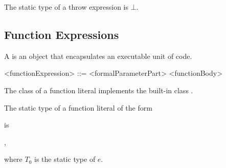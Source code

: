 \documentclass[makeidx]{article}
\begin{document}

\LMHash{}%
The static type of a throw expression is $\bot$.


\subsection{Function Expressions}

\LMHash{}%
A 
is an object that encapsulates an executable unit of code.

\begin{grammar}
<functionExpression> ::= <formalParameterPart> <functionBody>
\end{grammar}


\LMHash{}%
The class of a function literal implements the built-in class \FUNCTION{}.

\LMHash{}%
The static type of a function literal of the form



\noindent
is

,

\noindent
where $T_0$ is the static type of $e$.
\end{document}
